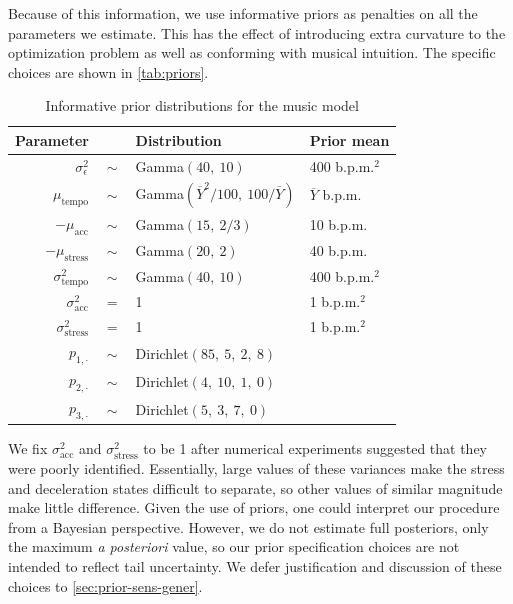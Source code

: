 \documentclass[aoas]{imsart}
\begin{document}
Because of this information, we use
informative priors as penalties on all the parameters we
estimate. This has the effect of introducing extra curvature to the
optimization problem as well as conforming with musical intuition. The
specific choices are shown in \autoref{tab:priors}. 
\begin{table}[t]
    \caption{Informative prior distributions for the music model}
  \label{tab:priors}
  \centering
  \begin{tabular}{@{}rcll@{}}
    \toprule
    Parameter & \phantom{a} & Distribution & Prior mean\\
    \midrule
    $\sigma^2_{\epsilon}$ & $\sim$ & Gamma$(40,\ 10)$ & 400 b.p.m.$^2$\\
    $\mu_{\textrm{tempo}}$ & $\sim$ & Gamma$(\overline{Y}^2/100,\ 100
                                      /\overline{Y})$ & $\overline{Y}$
                                                        b.p.m.\\
    $-\mu_{\textrm{acc}} $ & $\sim$ & Gamma$(15,\ 2/3)$ & 10 b.p.m.\\
    $-\mu_{\textrm{stress}} $ & $\sim$ & Gamma$(20,\ 2)$ & 40 b.p.m.\\
    $\sigma^2_{\textrm{tempo}} $ & $\sim$ & Gamma$(40,\ 10)$ & 400
                                                               b.p.m.$^2$\\
    $\sigma^2_{\textrm{acc}} $ & $=$ & 1 & 1 b.p.m.$^2$\\
    $\sigma^2_{\textrm{stress}} $ & $=$ & 1 & 1 b.p.m.$^2$\\
    $p_{1,\cdot}$ & $\sim$ & Dirichlet$(85,\ 5,\ 2,\ 8)$ \\
    $p_{2,\cdot}$ & $\sim$ & Dirichlet$(4,\ 10,\ 1,\ 0)$ \\
    $p_{3,\cdot}$ & $\sim$ & Dirichlet$(5,\ 3,\ 7,\ 0)$ \\
    \bottomrule
  \end{tabular}
\end{table}
We fix $\sigma^2_{\textrm{acc}}$ and $\sigma^2_{\textrm{stress}}$ to
be 1 after numerical experiments suggested
that they were poorly identified. Essentially, large values of these
variances make the stress and deceleration states difficult to
separate, so other values of similar magnitude make little
difference. Given the use of priors, one could interpret our
procedure from a Bayesian perspective. However, we do not estimate full
posteriors, only the maximum \emph{a posteriori} value, so our prior
specification choices
are not intended to reflect tail uncertainty. We defer justification and
discussion of these choices to 
\autoref{sec:prior-sens-gener}. 
\end{document}
